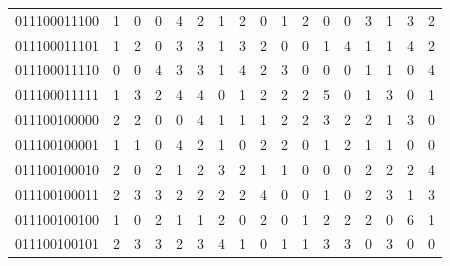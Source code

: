 \documentclass[10pt,a4paper]{article}
\begin{document}
\begin{longtable}{ |c|c|c|c|c|c|c|c|c|c|c|c|c|c|c|c|c| }
    011100011100              & 1                            & 0                                & 0                            & 4                              & 2   & 1   & 2   & 0   & 1   & 2   & 0   & 0   & 3   & 1   & 3   & 2   \\
    011100011101              & 1                            & 2                                & 0                            & 3                              & 3   & 1   & 3   & 2   & 0   & 0   & 1   & 4   & 1   & 1   & 4   & 2   \\
    011100011110              & 0                            & 0                                & 4                            & 3                              & 3   & 1   & 4   & 2   & 3   & 0   & 0   & 0   & 1   & 1   & 0   & 4   \\
    011100011111              & 1                            & 3                                & 2                            & 4                              & 4   & 0   & 1   & 2   & 2   & 2   & 5   & 0   & 1   & 3   & 0   & 1   \\
    011100100000              & 2                            & 2                                & 0                            & 0                              & 4   & 1   & 1   & 1   & 2   & 2   & 3   & 2   & 2   & 1   & 3   & 0   \\
    011100100001              & 1                            & 1                                & 0                            & 4                              & 2   & 1   & 0   & 2   & 2   & 0   & 1   & 2   & 1   & 1   & 0   & 0   \\
    011100100010              & 2                            & 0                                & 2                            & 1                              & 2   & 3   & 2   & 1   & 1   & 0   & 0   & 0   & 2   & 2   & 2   & 4   \\
    011100100011              & 2                            & 3                                & 3                            & 2                              & 2   & 2   & 2   & 4   & 0   & 0   & 1   & 0   & 2   & 3   & 1   & 3   \\
    011100100100              & 1                            & 0                                & 2                            & 1                              & 1   & 2   & 0   & 2   & 0   & 1   & 2   & 2   & 2   & 0   & 6   & 1   \\
    011100100101              & 2                            & 3                                & 3                            & 2                              & 3   & 4   & 1   & 0   & 1   & 1   & 3   & 3   & 0   & 3   & 0   & 0   \\

\end{longtable}
\end{document}
